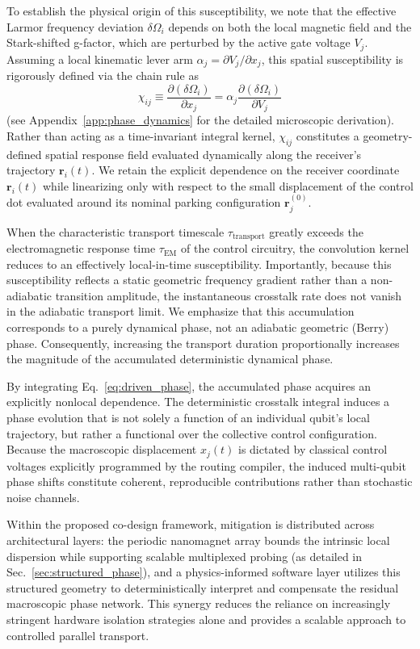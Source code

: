 \documentclass[a4paper,twocolumn,11pt]{quantumarticle}
\begin{document}
To establish the physical origin of this susceptibility, we note that the effective Larmor frequency deviation $\delta\Omega_i$ depends on both the local magnetic field and the Stark-shifted g-factor, which are perturbed by the active gate voltage $V_j$. Assuming a local kinematic lever arm $\alpha_j = \partial V_j / \partial x_j$, this spatial susceptibility is rigorously defined via the chain rule as 
\begin{equation}
    \chi_{ij} \equiv \frac{\partial (\delta\Omega_i)}{\partial x_j} = \alpha_j \frac{\partial (\delta\Omega_i)}{\partial V_j}
\end{equation}
(see Appendix~\ref{app:phase_dynamics} for the detailed microscopic derivation). Rather than acting as a time-invariant integral kernel, $\chi_{ij}$ constitutes a geometry-defined spatial response field evaluated dynamically along the receiver's trajectory $\mathbf{r}_i(t)$. We retain the explicit dependence on the receiver coordinate $\mathbf{r}_i(t)$ while linearizing only with respect to the small displacement of the control dot evaluated around its nominal parking configuration $\mathbf{r}_j^{(0)}$. 

When the characteristic transport timescale $\tau_{\text{transport}}$ greatly exceeds the electromagnetic response time $\tau_{\text{EM}}$ of the control circuitry, the convolution kernel reduces to an effectively local-in-time susceptibility. Importantly, because this susceptibility reflects a static geometric frequency gradient rather than a non-adiabatic transition amplitude, the instantaneous crosstalk rate does not vanish in the adiabatic transport limit. We emphasize that this accumulation corresponds to a purely dynamical phase, not an adiabatic geometric (Berry) phase. Consequently, increasing the transport duration proportionally increases the magnitude of the accumulated deterministic dynamical phase.

By integrating Eq.~\eqref{eq:driven_phase}, the accumulated phase acquires an explicitly nonlocal dependence. The deterministic crosstalk integral induces a phase evolution that is not solely a function of an individual qubit's local trajectory, but rather a functional over the collective control configuration. Because the macroscopic displacement $x_j(t)$ is dictated by classical control voltages explicitly programmed by the routing compiler, the induced multi-qubit phase shifts constitute coherent, reproducible contributions rather than stochastic noise channels. 

Within the proposed co-design framework, mitigation is distributed across architectural layers: the periodic nanomagnet array bounds the intrinsic local dispersion while supporting scalable multiplexed probing (as detailed in Sec.~\ref{sec:structured_phase}), and a physics-informed software layer utilizes this structured geometry to deterministically interpret and compensate the residual macroscopic phase network. This synergy reduces the reliance on increasingly stringent hardware isolation strategies alone and provides a scalable approach to controlled parallel transport.
\end{document}
